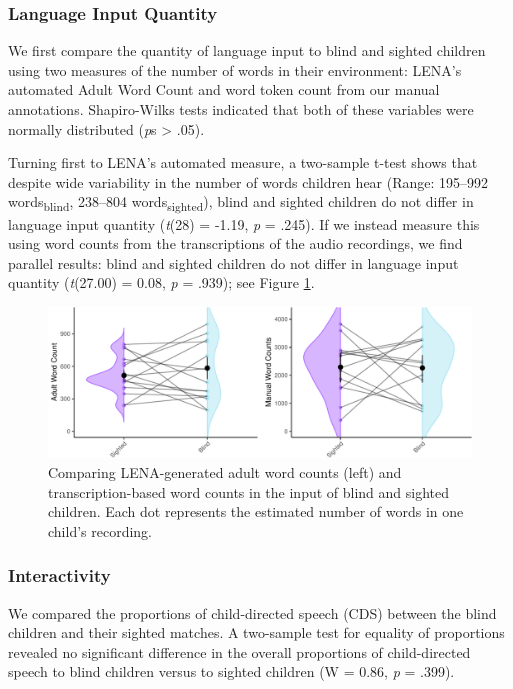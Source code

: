\documentclass[
  man,floatsintext]{apa6}
\begin{document}
\hypertarget{language-input-quantity}{%
\subsubsection{Language Input Quantity}\label{language-input-quantity}}

We first compare the quantity of language input to blind and sighted children using two measures of the number of words in their environment: LENA's automated Adult Word Count and word token count from our manual annotations. Shapiro-Wilks tests indicated that both of these variables were normally distributed (\emph{p}s \textgreater{} .05).

Turning first to LENA's automated measure, a two-sample t-test shows that despite wide variability in the number of words children hear (Range: 195--992 words\textsubscript{blind}, 238--804 words\textsubscript{sighted}), blind and sighted children do not differ in language input quantity (\emph{t}(28) = -1.19, \emph{p} = .245). If we instead measure this using word counts from the transcriptions of the audio recordings, we find parallel results: blind and sighted children do not differ in language input quantity (\emph{t}(27.00) = 0.08, \emph{p} = .939); see Figure \ref{fig:quantity-plots}.

\begin{figure}
\centering
\includegraphics{input_quality_manuscript_files/figure-latex/quantity-plots-1.pdf}
\caption{\label{fig:quantity-plots}Comparing LENA-generated adult word counts (left) and transcription-based word counts in the input of blind and sighted children. Each dot represents the estimated number of words in one child's recording.}
\end{figure}

\hypertarget{interactivity-1}{%
\subsubsection{Interactivity}\label{interactivity-1}}

We compared the proportions of child-directed speech (CDS) between the blind children and their sighted matches. A two-sample test for equality of proportions revealed no significant difference in the overall proportions of child-directed speech to blind children versus to sighted children (W = 0.86, \emph{p} = .399).
\end{document}
